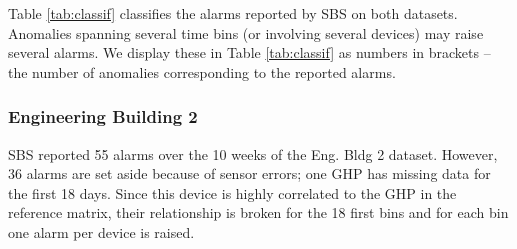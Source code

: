 Table \ref{tab:classif} classifies the alarms reported by SBS on both datasets.
 Anomalies spanning several time bins (or involving several devices) may raise several alarms.  We display these in Table \ref{tab:classif} 
 as numbers in brackets -- the number of anomalies corresponding to the reported alarms.

\subsubsection{Engineering Building 2}


SBS reported 55 alarms over the 10 weeks of the Eng. Bldg 2 dataset.
However, 36 alarms are set aside because of sensor errors; one GHP has missing data for the first 18 days.
Since this device is highly correlated to the GHP in the reference matrix, their relationship is broken for the 18 first bins and 
for each bin one alarm per device is raised.

